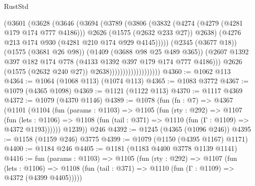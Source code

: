 \begin{lexlean}{RustStd}
\begin{coremodule}
{\begin{coremodule}
{{{{{{{{{{                                      (@3601
                                        (@3628
                                          (@3646
                                            (@3694
                                              (@3789
                                                (@3806
                                                  (@3832
                                                    (@4274 (@4279 (@4281 @179 @174 @777 @4186)))
                                                    @2626
                                                    (@1575 (@2632 @233 @27))
                                                    @2638)
                                                  (@4276
                                                    @213
                                                    @174
                                                    @930
                                                    (@4281 @210 @174 @929 @4145)))))
                                            (@2345 (@3677 @18))
                                            (@1575 (@3681 @26 @98))
                                            (@1409 (@3688 @98 @25 @489 @365))
                                            (@2607
                                              @1392
                                              @397
                                              @182
                                              @174
                                              @778
                                              (@4133 @1392 @397 @179 @174 @777 @4186)))
                                          @2626
                                          (@1575 (@2632 @240 @27))
                                          @2638)))))))))))))))))))
@4360 := @1062 @113
@4364 := @1064 (@1068 @113) (@1074 @113)
@4365 := @1083 @3772
@4367 := @1079 (@4365 @1098)
@4369 := @1121 (@1122 @113)
@4370 := @1117 @4369
@4372 := @1079 (@4370 @1146)
@4389 := @1078
    (fun (fn : @7) =>
    @4367
      (@1101
        (@1104
          (fun (params : @1103) =>
          @1105
            (fun (rty : @292) =>
            @1107
              (fun (lets : @1106) =>
              @1108 (fun (tail : @371) => @1110 (fun (Γ : @1109) => @4372 @1193))))))
        @1239))
    @246
@4392 := @1245 (@4365 (@1096 @246))
@4395 := @1158 (@1159 @246) @3775
@4399 := @1079 (@1150 (@4395 @1167) @1171)
@4400 := @1184 @246
@4405 := @1181 (@1183 @4400 @3778 @1139 @1141)
@4416 := fun (params : @1103) =>
  @1105
    (fun (rty : @292) =>
    @1107
      (fun (lets : @1106) =>
      @1108 (fun (tail : @371) => @1110 (fun (Γ : @1109) => @4372 (@4399 @4405)))))
}}}}}}}}}}
\end{coremodule}}
\end{coremodule}
\end{lexlean}
